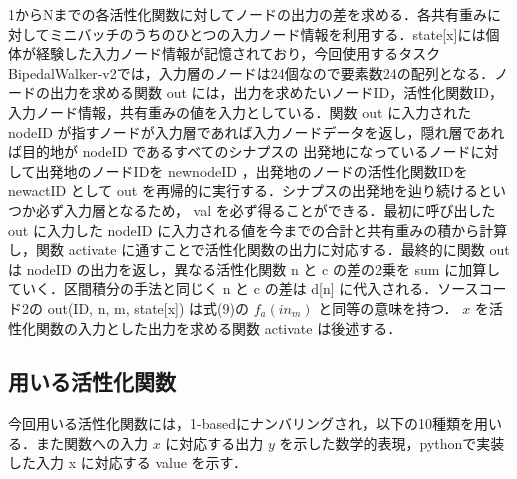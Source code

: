 1からNまでの各活性化関数に対してノードの出力の差を求める．各共有重みに対してミニバッチのうちのひとつの入力ノード情報を利用する．state[x]には個体が経験した入力ノード情報が記憶されており，今回使用するタスクBipedalWalker-v2\cite{OpenAI}では，入力層のノードは24個なので要素数24の配列となる．ノードの出力を求める関数 out には，出力を求めたいノードID，活性化関数ID，入力ノード情報，共有重みの値を入力としている．関数 out に入力された nodeID が指すノードが入力層であれば入力ノードデータを返し，隠れ層であれば目的地が nodeID であるすべてのシナプスの 出発地になっているノードに対して出発地のノードIDを newnodeID ，出発地のノードの活性化関数IDを newactID として out を再帰的に実行する．シナプスの出発地を辿り続けるといつか必ず入力層となるため， val を必ず得ることができる．最初に呼び出した out に入力した nodeID に入力される値を今までの合計と共有重みの積から計算し，関数 activate に通すことで活性化関数の出力に対応する．最終的に関数 out は nodeID の出力を返し，異なる活性化関数 n と c の差の2乗を sum に加算していく．区間積分の手法と同じく n と c の差は d[n] に代入される．ソースコード2の out(ID, n, m, state[x]) は式(9)の $ f_{a}(in_{m}) $ と同等の意味を持つ． $ x $ を活性化関数の入力とした出力を求める関数 activate は後述する．

\clearpage
\subsection{用いる活性化関数}
今回用いる活性化関数には，1-basedにナンバリングされ，以下の10種類を用いる．また関数への入力 $ x $ に対応する出力 $ y $ を示した数学的表現，pythonで実装した入力 x に対応する value を示す．

